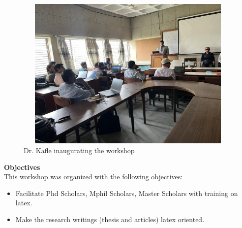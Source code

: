 \documentclass[a4paper,12pt]{report}
\begin{document}
\begin{figure}[hb!]
  \centering
  \includegraphics[width=14cm, height=7.5cm]{jeevansir.jpg}
  \caption{Dr. Kafle inaugurating the workshop}
\end{figure}
\clearpage


{\Large \textbf{Objectives}}\\

This workshop was organized with the following objectives:
\begin{itemize}
\item Facilitate Phd Scholars, Mphil Scholars, Master Scholars with training on latex.
\item Make the research writings (thesis and articles) latex oriented.
\end{itemize}
\end{document}
